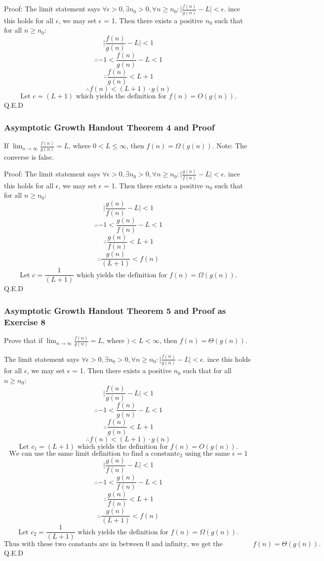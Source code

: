 \documentclass{article}
\begin{document}
Proof: 
The limit statement says $\forall \epsilon > 0, \exists n_0 > 0, \forall n \geq n_0 : \big| \frac{f(n)}{g(n)} - L \big| < \epsilon$. ince this holds for all $\epsilon$, we may set $\epsilon$ = 1. Then there exists a positive $n_0$ such that for all $n \geq n_0$:
$$\big| \frac{f(n)}{g(n)} - L \big| < 1$$
$$\therefore  -1 < \frac{f(n)}{g(n)} - L < 1$$
$$\therefore \frac{f(n)}{g(n)}  <L + 1$$
$$\therefore f(n) < (L + 1) \cdot g(n)$$
$$\text{Let } c = (L + 1) \text{ which yields the  definition for } f(n) = O(g(n)).$$
Q.E.D

\subsubsection{Asymptotic Growth Handout Theorem 4 and Proof}
If $\lim_{n \rightarrow \infty} \frac{f(n)}{g(n)} = L$, where $0 < L \leq \infty$, then $f(n) = \Omega(g(n))$. Note: The converse is false.

Proof: 
The limit statement says $\forall \epsilon > 0, \exists n_0 > 0, \forall n \geq n_0 : \big| \frac{g(n)}{f(n)} - L \big| < \epsilon$. ince this holds for all $\epsilon$, we may set $\epsilon$ = 1. Then there exists a positive $n_0$ such that for all $n \geq n_0$:
$$\big| \frac{g(n)}{f(n)} - L \big| < 1$$
$$\therefore  -1 < \frac{g(n)}{f(n)} - L < 1$$
$$\therefore \frac{g(n)}{f(n)}  <L + 1$$
$$\therefore \frac{g(n)}{(L + 1)} < f(n)$$
$$\text{Let } c = \frac{1}{(L + 1)} \text{ which yields the  definition for } f(n) = \Omega(g(n)).$$
Q.E.D

\subsubsection{Asymptotic Growth Handout Theorem 5 and Proof as Exercise 8}

Prove that if $\lim_{n \rightarrow \infty} \frac{f(n)}{g(n)} = L$, where $) < L < \infty$, then $f(n) = \Theta(g(n))$.

The limit statement says $\forall \epsilon > 0, \exists n_0 > 0, \forall n \geq n_0 : \big| \frac{f(n)}{g(n)} - L \big| < \epsilon$. ince this holds for all $\epsilon$, we may set $\epsilon$ = 1. Then there exists a positive $n_0$ such that for all $n \geq n_0$:
$$\big| \frac{f(n)}{g(n)} - L \big| < 1$$
$$\therefore  -1 < \frac{f(n)}{g(n)} - L < 1$$
$$\therefore \frac{f(n)}{g(n)}  <L + 1$$
$$\therefore {f(n)} < (L+1) \cdot g(n)$$
$$\text{Let } c_1 = {(L + 1)} \text{ which yields the  definition for } f(n) = O(g(n)).$$
$$\text{We can use the same limit definition to find a constant} c_2 \text{ using the same } \epsilon = 1$$
$$\big| \frac{g(n)}{f(n)} - L \big| < 1$$
$$\therefore  -1 < \frac{g(n)}{f(n)} - L < 1$$
$$\therefore \frac{g(n)}{f(n)}  <L + 1$$
$$\therefore \frac{g(n)}{(L + 1)} < f(n)$$
$$\text{Let } c_2 = \frac{1}{(L + 1)} \text{ which yields the  definition for } f(n) = \Omega(g(n)).$$
$$\text{Thus with these two constants are in between 0 and infinity, we get the definition for } f(n) = \Theta(g(n)).$$
Q.E.D
\end{document}
